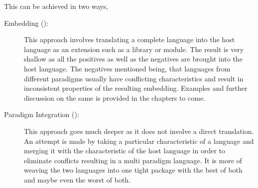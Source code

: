 \documentclass[thesis-solanki.tex]{subfiles}
\begin{document}
This can be achieved in two ways,
\begin{description}
\item [Embedding ():]

  This approach involves\xxx{,} translating a complete language into the host language as an extension such as a
  library  or module\xxx{ }.
  The result is very shallow as all the positives as well as the negatives are brought into the host language.
  The negatives mentioned being, that languages from different paradigms usually have conflicting characteristics
  and result in inconsistent properties of the resulting embedding.
  Examples and further discussion on the same is provided in the chapters to come.

\item [Paradigm Integration ():]

\par This approach goes much deeper as it does not involve a direct translation. An attempt is made by taking a particular characteristic of a language 
and merging it with the characteristic of the host language in order to eliminate conflicts resulting in a multi paradigm language. It is more of weaving 
the two languages into one tight package with the best of both and maybe even the worst of both.       
\end{description}


%






\end{document}
